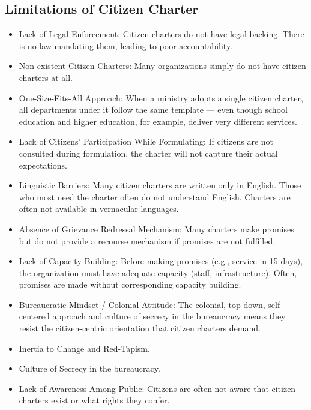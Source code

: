 \subsection{Limitations of Citizen Charter}
\begin{itemize}
\item Lack of Legal Enforcement: Citizen charters do not have legal backing. There is no law mandating them, leading to poor accountability.
\item Non-existent Citizen Charters: Many organizations simply do not have citizen charters at all.
\item One-Size-Fits-All Approach: When a ministry adopts a single citizen charter, all departments under it follow the same template --- even though school education and higher education, for example, deliver very different services.
\item Lack of Citizens' Participation While Formulating: If citizens are not consulted during formulation, the charter will not capture their actual expectations.
\item Linguistic Barriers: Many citizen charters are written only in English. Those who most need the charter often do not understand English. Charters are often not available in vernacular languages.
\item Absence of Grievance Redressal Mechanism: Many charters make promises but do not provide a recourse mechanism if promises are not fulfilled.
\item Lack of Capacity Building: Before making promises (e.g., service in 15 days), the organization must have adequate capacity (staff, infrastructure). Often, promises are made without corresponding capacity building.
\item Bureaucratic Mindset / Colonial Attitude: The colonial, top-down, self-centered approach and culture of secrecy in the bureaucracy means they resist the citizen-centric orientation that citizen charters demand.
\item Inertia to Change and Red-Tapism.
\item Culture of Secrecy in the bureaucracy.
\item Lack of Awareness Among Public: Citizens are often not aware that citizen charters exist or what rights they confer.
\end{itemize}

